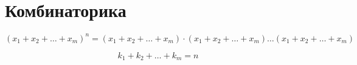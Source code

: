 \section{Комбинаторика}
\begin{lemma}
	$$\left(x_{1}+x_{2}+\ldots+x_{m}\right)^{n} = \left(x_{1}+x_{2}+\ldots+x_{m}\right)\cdot\left(x_{1}+x_{2}+\ldots+x_{m}\right) \ldots \left(x_{1}+x_{2}+\ldots+x_{m}\right)$$
	
	$$
	k_{1}+k_{2}+\ldots+k_{m}=n
	$$
\end{lemma}
